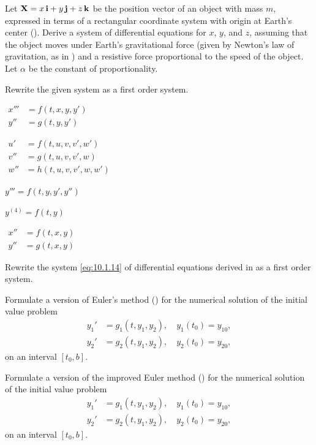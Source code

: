 \begin{exerciselist}
\item\label{exer:10.1.4}Let $\mathbf{X}=x\,\mathbf{i}+y\,\mathbf{j}+z\,\mathbf{k}$ be the position vector
of an object with mass $m$, expressed in terms of a rectangular
coordinate system with origin at Earth's center
(). Derive a system of differential equations for
$x$, $y$, and $z$, assuming that the object moves under Earth's
gravitational force (given by Newton's law of gravitation, as in
 ) and a resistive force proportional to the
speed of the object. Let $\alpha$ be the constant of proportionality.



\item\label{exer:10.1.5}Rewrite the given system as a first order system.
%
\begin{alist*}[columns=2]
\item $\begin{aligned} x''' &= f(t,x,y,y')\\ y'' &= g(t,y,y') \end{aligned}$
\item $\begin{aligned}
u' &=f(t,u,v,v',w')\\ v''&=g(t,u,v,v',w)\\w''&=h(t,u,v,v',w,w')
\end{aligned}$\bigskip
\item $y''' =f(t,y,y',y'')$
\item $y^{(4)} = f(t,y)$\bigskip
\item $\begin{aligned} x'' &= f(t,x,y)\\ y'' &=g(t,x,y) \end{aligned}$
\end{alist*}

\item\label{exer:10.1.6}Rewrite the system \eqref{eq:10.1.14} of differential equations derived in
   as a first order system.


\item\label{exer:10.1.7}Formulate a version of Euler's method ()
for the numerical solution of the initial value problem
\begin{align*}
y_1'&=g_1(t,y_1,y_2),\quad y_1(t_0)=y_{10},\\
y_2'&=g_2(t,y_1,y_2),\quad y_2(t_0)=y_{20},
\end{align*}
on an interval $[t_0,b]$.


\item\label{exer:10.1.8}Formulate a version of the improved Euler method
()
for the numerical solution of the initial value problem
\begin{align*}
y_1'&=g_1(t,y_1,y_2),\quad y_1(t_0)=y_{10},\\
y_2'&=g_2(t,y_1,y_2),\quad y_2(t_0)=y_{20},
\end{align*}
on an interval $[t_0,b]$.

\end{exerciselist}


